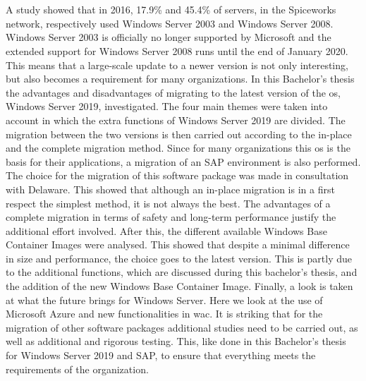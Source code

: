 \chapter*{}
A study \autocite{Tsai2016} showed that in 2016, 17.9\% and 45.4\% of servers, in the Spiceworks network, respectively used Windows Server 2003 and Windows Server 2008. Windows Server 2003 is officially no longer supported by Microsoft and the extended support for Windows Server 2008 runs until the end of January 2020. This means that a large-scale update to a newer version is not only interesting, but also becomes a requirement for many organizations. In this Bachelor's thesis the advantages and disadvantages of migrating to the latest version of the \acrshort{os},
Windows Server 2019, investigated. The four main themes were taken into account in which the extra functions of Windows Server 2019 are divided. The migration between the two versions is then carried out according to the in-place and the complete migration method. Since for many organizations this \acrshort{os} is the basis for their applications, a migration of an SAP environment is also performed. The choice for the
migration of this software package was made in consultation with Delaware. 
This showed that although an in-place migration is in a first respect the simplest method, it is not always the best. The advantages of a complete migration in terms of safety and long-term performance justify the additional effort involved.
After this, the different available Windows Base Container Images were analysed. This showed that despite a minimal difference in size and performance, the choice goes to the latest version. This is partly due to the additional functions, which are discussed during this bachelor's thesis, and the addition of the new Windows Base Container Image.
Finally, a look is taken at what the future brings for Windows Server. Here we look at the use of Microsoft Azure and new functionalities in
\acrlong{wac}. 
It is striking that for the migration of other software packages additional studies need to be carried out, as well as additional and rigorous testing. This, like done in this Bachelor's thesis for Windows Server 2019 and SAP, to ensure that everything meets the requirements of the organization.